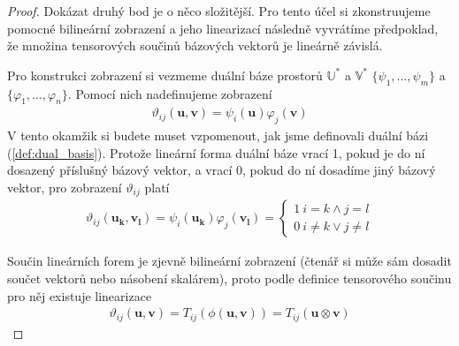 \documentclass[a5paper,12pt]{amsbook}
\theoremstyle{definition}
\newcommand{\myvec}[1]{\mathbf{#1}}
\newcommand{\myspace}[1]{\mathbb{#1}}
\begin{document}
\begin{proof}
\medskip\noindent
Dokázat druhý bod je o něco složitější. Pro tento účel si zkonstruujeme pomocné bilineární
zobrazení a jeho linearizací následně vyvrátíme předpoklad, že množina tensorových
součinů bázových vektorů je lineárně závislá.

Pro konstrukci zobrazení si vezmeme duální báze prostorů $\myspace{U^*}$ a $\myspace{V^*}$
$\{\psi_1, \dots, \psi_m\}$ a $\{\varphi_1, \dots, \varphi_n\}$. Pomocí nich nadefinujeme
zobrazení
\begin{equation*}
\begin{split}
\vartheta_{ij}(\myvec{u}, \myvec{v}) = \psi_i(\myvec{u})\varphi_j(\myvec{v})
\end{split}
\end{equation*}
V tento okamžik si budete muset vzpomenout, jak jsme definovali duální bázi (\ref{def:dual_basis}).
Protože lineární forma duální báze vrací 1, pokud je do ní dosazený příslušný bázový vektor, a
vrací 0, pokud do ní dosadíme jiný bázový vektor, pro zobrazení $\vartheta_{ij}$ platí
\begin{equation*}
\begin{split}
\vartheta_{ij}(\myvec{u_k}, \myvec{v_l}) = \psi_i(\myvec{u_k})\varphi_j(\myvec{v_l}) =
\begin{cases}
  1 \: i = k \wedge j = l \\
  0 \: i \neq k \vee j \neq l
\end{cases}
\end{split}
\end{equation*}

Součin lineárních forem je zjevně bilineární zobrazení (čtenář si může sám dosadit
součet vektorů nebo násobení skalárem), proto podle definice tensorového součinu pro něj existuje
linearizace
\begin{equation*}
\begin{split}
\vartheta_{ij}(\myvec{u}, \myvec{v}) = T_{ij}(\phi(\myvec{u}, \myvec{v})) = T_{ij}(\myvec{u}\otimes\myvec{v})
\end{split}
\end{equation*}


\end{proof}
\end{document}
